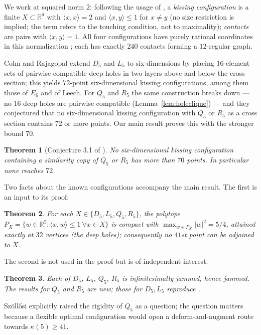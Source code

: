 \documentclass[11pt]{article}
\newtheorem{theorem}{Theorem}
\theoremstyle{remark}
\newcommand{\R}{\mathbb{R}}
\newcommand{\ip}[2]{\langle #1,#2\rangle}
\begin{document}
We work at squared norm $2$: following the usage of \cite{CR2024}, a
\emph{kissing configuration} is a finite $X\subset\R^d$ with
$\ip{x}{x}=2$ and $\ip{x}{y}\le 1$ for $x\ne y$ (no size restriction
is implied; the term refers to the touching condition, not to
maximality); \emph{contacts} are pairs with $\ip{x}{y}=1$. All four configurations
have purely rational coordinates in this normalization
\cite[Table~2.2]{CR2024}; each has exactly $240$ contacts forming a
$12$-regular graph.

Cohn and Rajagopal \cite[\S3]{CR2024} extend $D_5$ and $L_5$ to six
dimensions by placing $16$-element sets of pairwise compatible deep
holes in two layers above and below the cross section; this yields
$72$-point six-dimensional kissing configurations, among them those of
$E_6$ and of Leech. For $Q_5$ and $R_5$ the same construction breaks
down --- no $16$ deep holes are pairwise compatible
(Lemma~\ref{lem:holeclique}) --- and they conjectured
\cite[Conjecture~3.1]{CR2024} that no six-dimensional kissing
configuration with $Q_5$ or $R_5$ as a cross section contains $72$ or
more points. Our main result proves this with the stronger bound $70$.

\begin{theorem}[Conjecture 3.1 of \cite{CR2024}]\label{thm:main}
No six-dimensional kissing configuration containing a similarity copy
of $Q_5$ or $R_5$ has more than $70$ points. In particular none reaches
$72$.
\end{theorem}

Two facts about the known configurations accompany the main result.
The first is an input to its proof:

\begin{theorem}\label{thm:no41}
For each $X\in\{D_5,L_5,Q_5,R_5\}$, the polytope
$P_X=\{w\in\R^5:\ip{x}{w}\le 1\ \forall x\in X\}$ is compact with
$\max_{w\in P_X}|w|^2=5/4$, attained exactly at $32$ vertices (the deep
holes); consequently no $41$st point can be adjoined to $X$.
\end{theorem}

The second is not used in the proof but is of independent interest:

\begin{theorem}\label{thm:jam}
Each of $D_5$, $L_5$, $Q_5$, $R_5$ is infinitesimally jammed, hence
jammed. The results for $Q_5$ and $R_5$ are new; those for $D_5,L_5$
reproduce \cite{CJKT2011}.
\end{theorem}

Sz\"oll\H{o}si explicitly raised the rigidity of $Q_5$ as a question;
the question matters because a flexible optimal configuration would open
a deform-and-augment route towards $\kappa(5)\ge 41$.
\end{document}
